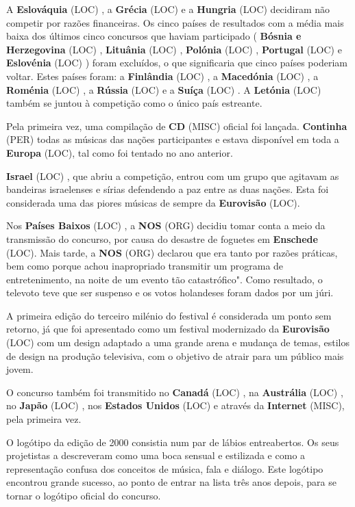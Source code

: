 \documentclass[12pt,a4paper]{article}
\begin{document}
A \textbf{Eslováquia} (LOC) , a \textbf{Grécia} (LOC) e a \textbf{Hungria} (LOC) decidiram não competir por razões financeiras. Os cinco países de resultados com a média mais baixa dos últimos cinco concursos que haviam participado ( \textbf{Bósnia e Herzegovina} (LOC) , \textbf{Lituânia} (LOC) , \textbf{Polónia} (LOC) , \textbf{Portugal} (LOC) e \textbf{Eslovénia} (LOC) ) foram excluídos, o que significaria que cinco países poderiam voltar. Estes países foram: a \textbf{Finlândia} (LOC) , a \textbf{Macedónia} (LOC) , a \textbf{Roménia} (LOC) , a \textbf{Rússia} (LOC) e a \textbf{Suíça} (LOC) . A \textbf{Letónia} (LOC) também se juntou à competição como o único país estreante.

Pela primeira vez, uma compilação de \textbf{CD} (MISC) oficial foi lançada. \textbf{Continha} (PER) todas as músicas das nações participantes e estava disponível em toda a \textbf{Europa} (LOC), tal como foi tentado no ano anterior.

\textbf{Israel} (LOC) , que abriu a competição, entrou com um grupo que agitavam as bandeiras israelenses e sírias defendendo a paz entre as duas nações. Esta foi considerada uma das piores músicas de sempre da \textbf{Eurovisão} (LOC).

Nos \textbf{Países Baixos} (LOC) , a \textbf{NOS} (ORG) decidiu tomar conta a meio da transmissão do concurso, por causa do desastre de foguetes em \textbf{Enschede} (LOC). Mais tarde, a \textbf{NOS} (ORG) declarou que era tanto por razões práticas, bem como porque achou inapropriado transmitir um programa de entretenimento, na noite de um evento tão catastrófico". Como resultado, o televoto teve que ser suspenso e os votos holandeses foram dados por um júri.

A primeira edição do terceiro milénio do festival é considerada um ponto sem retorno, já que foi apresentado como um festival modernizado da \textbf{Eurovisão} (LOC) com um design adaptado a uma grande arena e mudança de temas, estilos de design na produção televisiva, com o objetivo de atrair para um público mais jovem.

O concurso também foi transmitido no \textbf{Canadá} (LOC) , na \textbf{Austrália} (LOC) , no \textbf{Japão} (LOC) , nos \textbf{Estados Unidos} (LOC) e através da \textbf{Internet} (MISC), pela primeira vez.

O logótipo da edição de 2000 consistia num par de lábios entreabertos. Os seus projetistas a descreveram como uma boca sensual e estilizada e como a representação confusa dos conceitos de música, fala e diálogo. Este logótipo encontrou grande sucesso, ao ponto de entrar na lista três anos depois, para se tornar o logótipo oficial do concurso.
\end{document}
